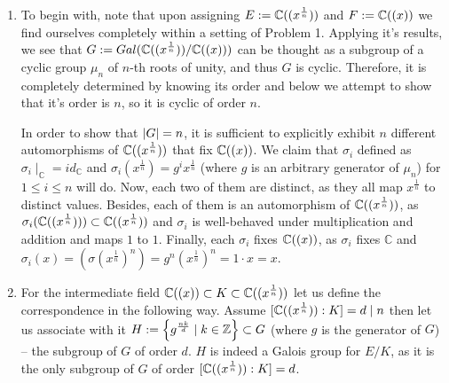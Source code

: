 \documentclass[8pt]{article} %
\begin{document}
\begin{enumerate}[label=\bfseries Problem \arabic*.]
{\begin{enumerate}[label=(\arabic*).]
{				have more than $n$ roots. To finish the verification of a claim that $\mathbb{C}((x^{\frac{1}{n}}))$ is indeed a splitting field
				of $t^n-x=0$ over $\mathbb{C}((x))$, it is sufficient to show that $\E$ is generated over $\F$ by $x^{\frac{1}{n}}$.
				Now, given arbitrary $\sum_{i=-m}^{\infty}a_nx^{\frac{i}{n}}\in\E$, part $\sum_{i=-m}^0a_nx^{\frac{i}{n}}$ is a finite sum
				of products of elements of $\F$ with $x^{-\frac{1}{n}}$ and hence belongs to $\F(x^{\frac{1}{n}})$. Now, the remaining
				part $\sum_{i=0}^\infty a_nx^{\frac{i}{n}}$ can be realized as a finite sum
				$\sum_{k=0}^{n-1}\left((x^{\frac{1}{n}})^k\sum_{i=0}^\infty a_{in+k}x^i\right)$ and as every addend belongs to
				$\F(x^{\frac{1}{n}})$, the whole $\sum_{i=-m}^{\infty}a_nx^{\frac{i}{n}}$ belongs to $\F(x^{\frac{1}{n}})$ and as it was
				arbitrary, $E\subset\F(x^{\frac{1}{n}})$ which ends the proof of a claim.

				Thus $\E/\F$ is normal and separable, and hence Galois. 
				}
			\item{To begin with, note that upon assigning $E:=\mathbb{C}((x^{\frac{1}{n}}))$ and $F:=\mathbb{C}((x))$ we find ourselves completely within
				a setting of Problem 1. Applying it's results, we see that $G:=Gal(\mathbb{C}((x^{\frac{1}{n}}))/\mathbb{C}((x)))$ can be thought
				as a subgroup of a cyclic group $\mu_n$ of $n$-th roots of unity, and thus $G$ is cyclic. Therefore,
				it is completely determined by knowing its order and below we attempt to show that it's order is $n$,
				so it is cyclic of order $n$.

				In order to show that $\left|G\right|=n$, it is sufficient to explicitly exhibit $n$ different
				automorphisms of $\E$ that fix $\F$. We claim that $\sigma_i$ defined as $\sigma_i\mid_\mathbb{C}
				=id_\mathbb{C}$
				and $\sigma_i(x^{\frac{1}{n}})=g^ix^{\frac{1}{n}}$ (where $g$ is an arbitrary generator of $\mu_n$)
				for $1\leq i\leq n$ will do. Now, each two of them are distinct, as they all map $x^{\frac{1}{n}}$
				to distinct values. Besides, each of them is an automorphism of $\E$, as $\sigma_i(\mathbb{C}((x^{\frac{1}{n}})))\subset\mathbb{C}((x^{\frac{1}{n}}))$
				and $\sigma_i$ is well-behaved under multiplication and addition and maps $1$ to $1$. Finally,
				each $\sigma_i$ fixes $\F$, as $\sigma_i$ fixes $\mathbb{C}$ and $\sigma_i(x)=(\sigma(x^{\frac{1}{n}})
				^n)=g^n(x^{\frac{1}{n}})^n=1\cdot x=x$.
				}
			\item{For the intermediate field $\mathbb{C}((x))\subset K\subset\mathbb{C}((x^{\frac{1}{n}}))$ let us define the correspondence in the following way. Assume $[\mathbb{C}((x^{\frac{1}{n}})):K]=d\mid n$
				then let us associate with it $H:=\left\{g^{\frac{nk}{d}}\mid k\in\mathbb{Z}\right\}\subset G$ (where $g$ is the generator of $G$) -- the 
				subgroup of $G$ of order $d$. $H$ is indeed a Galois group for $E/K$, as it is the only subgroup of $G$ of order $[\mathbb{C}((x^{\frac{1}{n}})):K]=d$. 
				
}
\end{enumerate}}
\end{enumerate}
\end{document}
